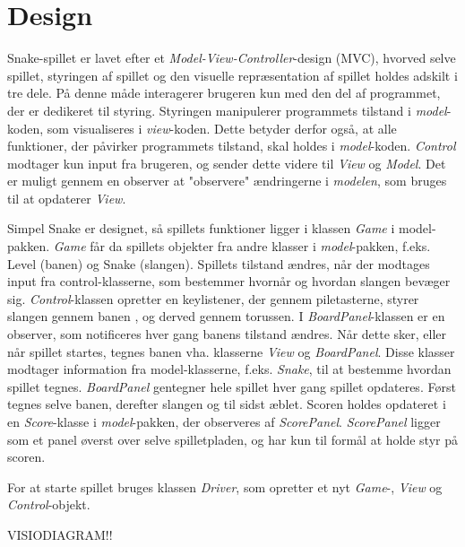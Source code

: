 \section{Design}
Snake-spillet er lavet efter et \textit{Model-View-Controller}-design (MVC), hvorved selve spillet, styringen af spillet og den visuelle repræsentation af spillet holdes adskilt i tre dele. På denne måde interagerer brugeren kun med den del af programmet, der er dedikeret til styring. Styringen manipulerer programmets tilstand i \textit{model}-koden, som visualiseres i \textit{view}-koden. Dette betyder derfor også, at alle funktioner, der påvirker programmets tilstand, skal holdes i \textit{model}-koden. \textit{Control} modtager kun input fra brugeren, og sender dette videre til \textit{View} og \textit{Model}. Det er muligt gennem en observer at "observere" ændringerne i \textit{modelen}, som bruges til at opdaterer \textit{View}.

Simpel Snake er designet, så spillets funktioner ligger i klassen \textit{Game} i model-pakken. \textit{Game} får da spillets objekter fra andre klasser i \textit{model}-pakken, f.eks. Level (banen) og Snake (slangen). Spillets tilstand ændres, når der modtages input fra control-klasserne, som bestemmer hvornår og hvordan slangen bevæger sig. \textit{Control}-klassen opretter en keylistener, der gennem piletasterne, styrer slangen gennem banen , og derved gennem torussen.
I \textit{BoardPanel}-klassen er en observer, som notificeres hver gang banens tilstand ændres. Når dette sker, eller når spillet startes, tegnes banen vha. klasserne \textit{View} og \textit{BoardPanel}. Disse klasser modtager information fra model-klasserne, f.eks. \textit{Snake}, til at bestemme hvordan spillet tegnes. \textit{BoardPanel} gentegner hele spillet hver gang spillet opdateres. Først tegnes selve banen, derefter slangen og til sidst æblet. 
Scoren holdes opdateret i en \textit{Score}-klasse i \textit{model}-pakken, der observeres af \textit{ScorePanel}. \textit{ScorePanel} ligger som et panel øverst over selve spilletpladen, og har kun til formål at holde styr på scoren.

For at starte spillet bruges klassen \textit{Driver}, som opretter et nyt \textit{Game}-, \textit{View} og \textit{Control}-objekt.

VISIODIAGRAM!!

